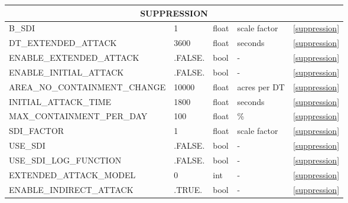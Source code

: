 \begin{landscape}
\begin{center}
\begin{longtable}{lllll}
\multicolumn{5}{c}{SUPPRESSION}                                                                                                                                               \\
\toprule
B\_SDI                                  & 1                          & float                  & scale factor                       & \ref{suppression}                    \\
DT\_EXTENDED\_ATTACK                    & 3600                       & float                  & seconds                            & \ref{suppression}                    \\
ENABLE\_EXTENDED\_ATTACK                & .FALSE.                    & bool                   & -                                  & \ref{suppression}                    \\
ENABLE\_INITIAL\_ATTACK                 & .FALSE.                    & bool                   & -                                  & \ref{suppression}                    \\
AREA\_NO\_CONTAINMENT\_CHANGE           & 10000                      & float                  & acres per DT                       & \ref{suppression}                    \\
INITIAL\_ATTACK\_TIME                   & 1800                       & float                  & seconds                            & \ref{suppression}                    \\
MAX\_CONTAINMENT\_PER\_DAY              & 100                        & float                  & \%                                 & \ref{suppression}                    \\
SDI\_FACTOR                             & 1                          & float                  & scale factor                       & \ref{suppression}                    \\
USE\_SDI                                & .FALSE.                    & bool                   & -                                  & \ref{suppression}                    \\
USE\_SDI\_LOG\_FUNCTION                 & .FALSE.                    & bool                   & -                                  & \ref{suppression}                    \\
EXTENDED\_ATTACK\_MODEL                 & 0                          & int                    & -                                  & \ref{suppression}                    \\
ENABLE\_INDIRECT\_ATTACK                & .TRUE.                     & bool                   & -                                  & \ref{suppression}                    \\

\end{longtable}
\end{center}
\end{landscape}
